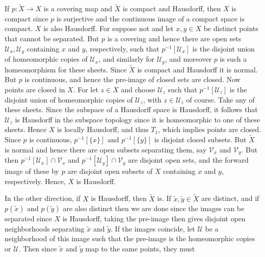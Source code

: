 \documentclass{book}                                                           %
\begin{document}
\begin{solution}
    If $p:\tilde{X}\rightarrow{X}$ is a covering map and $\tilde{X}$ is
    compact and Hausdorff, then $X$ is compact since $p$ is surjective and
    the continuous image of a compact space is compact. $X$ is also
    Hausdorff. For suppose not and let $x,y\in{X}$ be distinct points that
    cannot be separated. But $p$ is a covering and hence there are open sets
    $\mathcal{U}_{x},\mathcal{U}_{y}$ containing $x$ and $y$, respectively,
    such that $p^{\minus{1}}[\mathcal{U}_{x}]$ is the disjoint union of
    homeomorphic copies of $\mathcal{U}_{x}$, and similarly for
    $\mathcal{U}_{y}$, and moreover $p$ is such a homeomorphism for these
    sheets. Since $\tilde{X}$ is compact and Hausdorff it is normal. But $p$
    is continuous, and hence the pre-image of closed sets are closed. Now
    points are closed in $X$. For let $z\in{X}$ and choose $\mathcal{U}_{z}$
    such that $p^{\minus{1}}[\mathcal{U}_{z}]$ is the disjoint union of
    homeomorphic copies of $\mathcal{U}_{z}$, with $z\in\mathcal{U}_{z}$ of
    course. Take any of these sheets. Since the subspace of a Hausdorff
    space is Hausdorff, it follows that $\mathcal{U}_{z}$ is Hausdorff in
    the subspace topology since it is homeomorphic to one of these sheets.
    Hence $X$ is locally Hausdorff, and thus $T_{1}$, which implies points
    are closed. Since $p$ is continuous, $p^{\minus{1}}[\{x\}]$ and
    $p^{\minus{1}}[\{y\}]$ is disjoint closed subsets. But $\tilde{X}$ is
    normal and hence there are open subsets separating them, say
    $\mathcal{V}_{x}$ and $\mathcal{V}_{y}$. But then
    $p^{\minus{1}}[\mathcal{U}_{x}]\cap\mathcal{V}_{x}$ and
    $p^{\minus{1}}[\mathcal{U}_{y}]\cap\mathcal{V}_{y}$ are disjoint open
    sets, and the forward image of these by $p$ are disjoint open subsets
    of $X$ containing $x$ and $y$, respectively. Hence, $X$ is Hausdorff.
    \par\hfill\par
    In the other direction, if $X$ is Hausdorff, then $\tilde{X}$ is. If
    $\tilde{x},\tilde{y}\in\tilde{X}$ are distinct, and if $p(\tilde{x})$
    and $p(\tilde{y})$ are also distinct then we are done since the images
    can be separated since $X$ is Hausdorff, taking the pre-image then gives
    disjoint open neighborhoods separating $\tilde{x}$ and $\tilde{y}$. If
    the images coincide, let $\mathcal{U}$ be a neighborhood of this image
    such that the pre-image is the homeomorphic copies or $\mathcal{U}$.
    Then since $\tilde{x}$ and $\tilde{y}$ map to the same points, they must

\end{solution}
\end{document}
